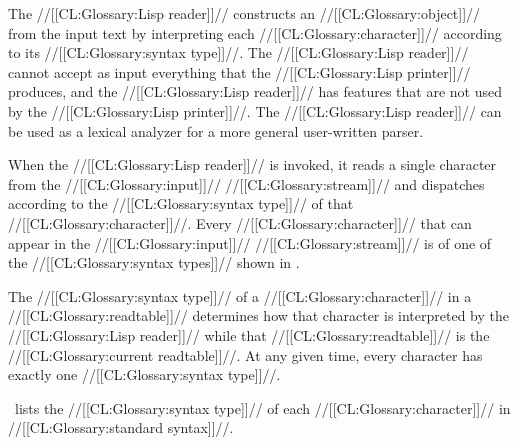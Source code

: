 \endSubsection%

 

The //[[CL:Glossary:Lisp reader]]// constructs an //[[CL:Glossary:object]]//  from the input text by interpreting each //[[CL:Glossary:character]]//  according to its //[[CL:Glossary:syntax type]]//. The //[[CL:Glossary:Lisp reader]]// cannot accept as input  everything that the //[[CL:Glossary:Lisp printer]]// produces, and the //[[CL:Glossary:Lisp reader]]// has features that are not used by the //[[CL:Glossary:Lisp printer]]//. The //[[CL:Glossary:Lisp reader]]// can be used as a lexical analyzer  for a more general user-written parser.

When the //[[CL:Glossary:Lisp reader]]// is invoked, it reads a single character from  the //[[CL:Glossary:input]]// //[[CL:Glossary:stream]]// and dispatches according to the //[[CL:Glossary:syntax type]]// of that //[[CL:Glossary:character]]//. Every //[[CL:Glossary:character]]// that can appear in the //[[CL:Glossary:input]]// //[[CL:Glossary:stream]]// is of one of the //[[CL:Glossary:syntax types]]// shown in \figref\PossibleSyntaxTypes.

 

The //[[CL:Glossary:syntax type]]// of a //[[CL:Glossary:character]]// in a //[[CL:Glossary:readtable]]// determines how that character is interpreted by the //[[CL:Glossary:Lisp reader]]// while that //[[CL:Glossary:readtable]]// is the //[[CL:Glossary:current readtable]]//. At any given time, every character has exactly one //[[CL:Glossary:syntax type]]//.

\Figref\CharSyntaxTypesInStdSyntax\  lists the //[[CL:Glossary:syntax type]]// of each //[[CL:Glossary:character]]// in //[[CL:Glossary:standard syntax]]//.


